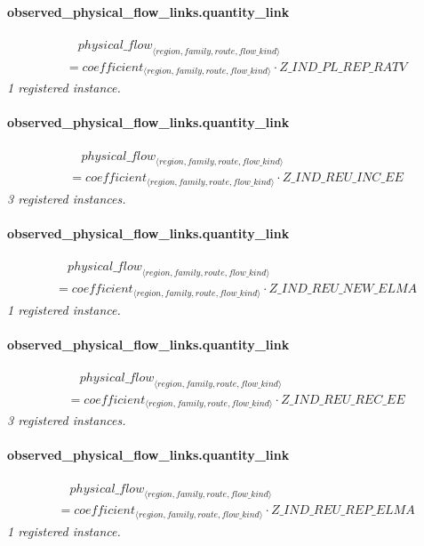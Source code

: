 \documentclass[11pt]{article}
\begin{document}
\paragraph{observed\_physical\_flow\_links.quantity\_link}
\begin{align*}
&\quad {physical\_flow}_{\langle region, family, route, flow\_kind\rangle}\\
&= coefficient_{\langle region, family, route, flow\_kind\rangle} \cdot Z\_IND\_PL\_REP\_RATV
\end{align*}
\noindent\emph{1 registered instance.}\par
\paragraph{observed\_physical\_flow\_links.quantity\_link}
\begin{align*}
&\quad {physical\_flow}_{\langle region, family, route, flow\_kind\rangle}\\
&= coefficient_{\langle region, family, route, flow\_kind\rangle} \cdot Z\_IND\_REU\_INC\_EE
\end{align*}
\noindent\emph{3 registered instances.}\par
\paragraph{observed\_physical\_flow\_links.quantity\_link}
\begin{align*}
&\quad {physical\_flow}_{\langle region, family, route, flow\_kind\rangle}\\
&= coefficient_{\langle region, family, route, flow\_kind\rangle} \cdot Z\_IND\_REU\_NEW\_ELMA
\end{align*}
\noindent\emph{1 registered instance.}\par
\paragraph{observed\_physical\_flow\_links.quantity\_link}
\begin{align*}
&\quad {physical\_flow}_{\langle region, family, route, flow\_kind\rangle}\\
&= coefficient_{\langle region, family, route, flow\_kind\rangle} \cdot Z\_IND\_REU\_REC\_EE
\end{align*}
\noindent\emph{3 registered instances.}\par
\paragraph{observed\_physical\_flow\_links.quantity\_link}
\begin{align*}
&\quad {physical\_flow}_{\langle region, family, route, flow\_kind\rangle}\\
&= coefficient_{\langle region, family, route, flow\_kind\rangle} \cdot Z\_IND\_REU\_REP\_ELMA
\end{align*}
\noindent\emph{1 registered instance.}\par
\end{document}
